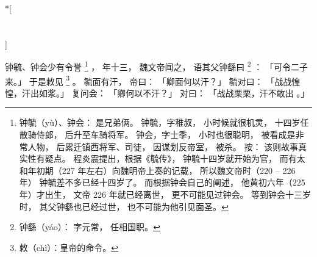 
\switchcolumn[0]*[\section{}]

钟毓、钟会少有令誉%
\footnote{%
    钟毓（yù）、钟会：
        是兄弟俩。
        钟毓，字稚叔，
        小时候就很机灵，
        十四岁任散骑侍郎，
        后升至车骑将军。
        钟会，字士季，
        小时也很聪明，
        被看成是非常人物，
        后累迁镇西将军、司徒，
        因谋划反帝室，
        被杀。
    按：
        该则故事真实性有疑点。
        程炎震提出，根据《毓传》，
        钟毓十四岁就开始为官，
        而有太和年初期（227 年左右）向魏明帝上奏的记载，
        所以魏文帝时（220 -- 226 年）
        钟毓差不多已经十四岁了。
        而根据钟会自己的阐述，
        他黄初六年（225 年）才出生，
        文帝 226 年就已经离世，
        更不可能见过钟会。
        等到钟会十三岁时，
        其父钟繇也已经过世，
        也不可能为他引见面圣。
}%
，
年十三，
魏文帝闻之，
语其父钟繇曰%
\footnote{%
    钟繇（yáo）：
        字元常，
        任相国职。
}%
：
「可令二子来。」
于是敕见%
\footnote{%
    敕（chì）：皇帝的命令。
}%
。
毓面有汗，
帝曰：
「卿面何以汗？」
毓对曰：
「战战惶惶，汗出如浆。」
复问会：
「卿何以不汗？」
对曰：
「战战栗栗，汗不敢出 。」

\switchcolumn



